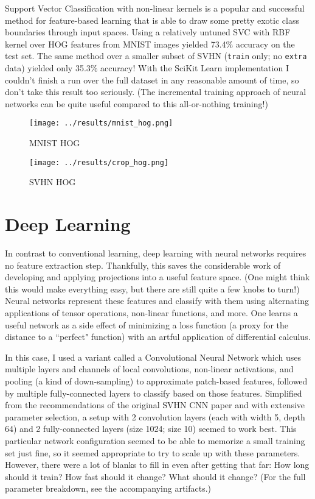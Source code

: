 \documentclass{article}
\begin{document}
Support Vector Classification with non-linear kernels is a popular and successful method for feature-based learning that is able to draw some pretty exotic class boundaries through input spaces. Using a relatively untuned SVC with RBF kernel over HOG features from MNIST images yielded 73.4\% accuracy on the test set. The same method over a smaller subset of SVHN (\texttt{train} only; no \texttt{extra} data) yielded only 35.3\% accuracy! With the SciKit Learn implementation I couldn't finish a run over the full dataset in any reasonable amount of time, so don't take this result too seriously. (The incremental training approach of neural networks can be quite useful compared to this all-or-nothing training!)

\begin{figure}[htbp]
  \centering
  \texttt{[image: ../results/mnist\_hog.png]}
  \caption{MNIST HOG}
  \label{fig:mnist_hog}
\end{figure}

\begin{figure}[htbp]
  \centering
  \texttt{[image: ../results/crop\_hog.png]}
  \caption{SVHN HOG}
  \label{fig:svhn_hog}
\end{figure}

\section{Deep Learning}

In contrast to conventional learning, deep learning with neural networks requires no feature extraction step. Thankfully, this saves the considerable work of developing and applying projections into a useful feature space. (One might think this would make everything easy, but there are still quite a few knobs to turn!) Neural networks represent these features and classify with them using alternating applications of tensor operations, non-linear functions, and more. One learns a useful network as a side effect of minimizing a loss function (a proxy for the distance to a ``perfect" function) with an artful application of differential calculus.

In this case, I used a variant called a Convolutional Neural Network which uses multiple layers and channels of local convolutions, non-linear activations, and pooling (a kind of down-sampling) to approximate patch-based features, followed by multiple fully-connected layers to classify based on those features. Simplified from the recommendations of the original SVHN CNN paper \cite{sermanet2012convolutional} and with extensive parameter selection, a setup with 2 convolution layers (each with width 5, depth 64) and 2 fully-connected layers (size 1024; size 10) seemed to work best. This particular network configuration seemed to be able to memorize a small training set just fine, so it seemed appropriate to try to scale up with these parameters. However, there were a lot of blanks to fill in even after getting that far: How long should it train? How fast should it change? What should it change? (For the full parameter breakdown, see the accompanying artifacts.)
\end{document}
